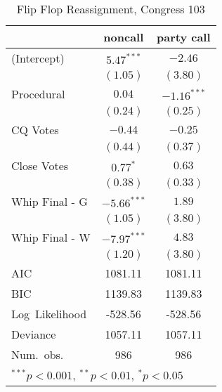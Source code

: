 \documentclass[12pt]{article}
\begin{document}
\begin{table}
	\begin{center}
		\begin{tabular}{l c c }
			\hline
			& noncall & party call \\
			\hline
			(Intercept)      & $5.47^{***}$  & $-2.46$       \\
			& $(1.05)$      & $(3.80)$      \\
			Procedural       & $0.04$        & $-1.16^{***}$ \\
			& $(0.24)$      & $(0.25)$      \\
			CQ Votes    & $-0.44$       & $-0.25$       \\
			& $(0.44)$      & $(0.37)$      \\
			Close Votes & $0.77^{*}$    & $0.63$        \\
			& $(0.38)$      & $(0.33)$      \\
			Whip Final - G     & $-5.66^{***}$ & $1.89$        \\
			& $(1.05)$      & $(3.80)$      \\
			Whip Final - W     & $-7.97^{***}$ & $4.83$        \\
			& $(1.20)$      & $(3.80)$      \\
			\hline
			AIC              & 1081.11       & 1081.11       \\
			BIC              & 1139.83       & 1139.83       \\
			Log\ Likelihood  & -528.56       & -528.56       \\
			Deviance         & 1057.11       & 1057.11       \\
			Num.\ obs.       & 986           & 986           \\
			\hline
			\multicolumn{3}{l}{\scriptsize{$^{***}p<0.001$, $^{**}p<0.01$, $^*p<0.05$}}
		\end{tabular}
		\caption{Flip Flop Reassignment, Congress 103}
	\end{center}
\end{table}
\end{document}
